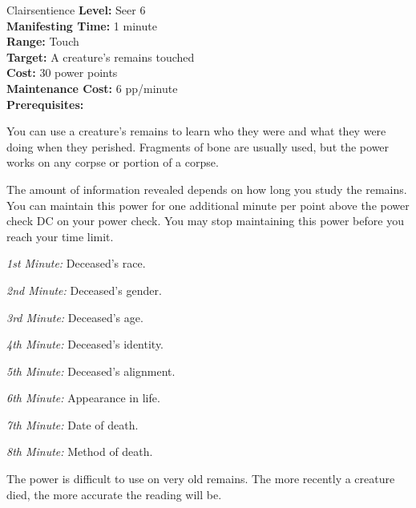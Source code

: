 {Clairsentience}
{
	\textbf{Level:}
	Seer 6\\
	\textbf{Manifesting Time:}
	1 minute\\
	\textbf{Range:}
	Touch\\
	\textbf{Target:}
	A creature's remains touched\\
	\textbf{Cost:}
	30 power points\\
	\textbf{Maintenance Cost:}
	6 pp/minute\\
	\textbf{Prerequisites:}
	\\
}
{
	You can use a creature's remains to learn who they were and what they were doing when they perished. Fragments of bone are usually used, but the power works on any corpse or portion of a corpse.

	The amount of information revealed depends on how long you study the remains. You can maintain this power for one additional minute per point above the power check DC on your power check. You may stop maintaining this power before you reach your time limit.

	\textit{1st Minute:} Deceased's race.

	\textit{2nd Minute:} Deceased's gender.

	\textit{3rd Minute:} Deceased's age.

	\textit{4th Minute:} Deceased's identity.

	\textit{5th Minute:} Deceased's alignment.

	\textit{6th Minute:} Appearance in life.

	\textit{7th Minute:} Date of death.

	\textit{8th Minute:} Method of death.

	The power is difficult to use on very old remains. The more recently a creature died, the more accurate the reading will be.

}